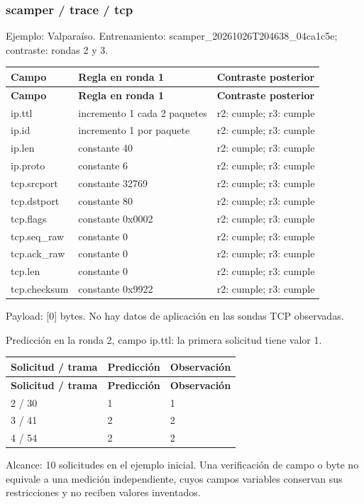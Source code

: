 \subsubsection{scamper / trace / tcp}
Ejemplo: Valparaíso. Entrenamiento: scamper\_\allowbreak{}20261026T204638\_\allowbreak{}04ca1c5e; contraste: rondas 2 y 3. 

\begingroup
\fontsize{9}{11}\selectfont
\addtocounter{table}{-1}
\begin{longtable}{p{3.1cm}p{5.8cm}p{5.1cm}}
\toprule
\textbf{Campo} & \textbf{Regla en ronda 1} & \textbf{Contraste posterior} \\ \midrule
\endfirsthead
\toprule
\textbf{Campo} & \textbf{Regla en ronda 1} & \textbf{Contraste posterior} \\ \midrule
\endhead
ip.ttl & incremento 1 cada 2 paquetes & r2: cumple; r3: cumple \\
ip.id & incremento 1 por paquete & r2: cumple; r3: cumple \\
ip.len & constante 40 & r2: cumple; r3: cumple \\
ip.proto & constante 6 & r2: cumple; r3: cumple \\
tcp.srcport & constante 32769 & r2: cumple; r3: cumple \\
tcp.dstport & constante 80 & r2: cumple; r3: cumple \\
tcp.flags & constante 0x0002 & r2: cumple; r3: cumple \\
tcp.seq\_\allowbreak{}raw & constante 0 & r2: cumple; r3: cumple \\
tcp.ack\_\allowbreak{}raw & constante 0 & r2: cumple; r3: cumple \\
tcp.len & constante 0 & r2: cumple; r3: cumple \\
tcp.checksum & constante 0x9922 & r2: cumple; r3: cumple \\
\bottomrule
\end{longtable}
\endgroup
Payload: [0] bytes. No hay datos de aplicación en las sondas TCP observadas.

Predicción en la ronda 2, campo ip.ttl: la primera solicitud tiene valor 1.

\begingroup
\fontsize{9}{11}\selectfont
\addtocounter{table}{-1}
\begin{longtable}{p{3.2cm}p{5.1cm}p{5.1cm}}
\toprule
\textbf{Solicitud / trama} & \textbf{Predicción} & \textbf{Observación} \\ \midrule
\endfirsthead
\toprule
\textbf{Solicitud / trama} & \textbf{Predicción} & \textbf{Observación} \\ \midrule
\endhead
2 / 30 & 1 & 1 \\
3 / 41 & 2 & 2 \\
4 / 54 & 2 & 2 \\
\bottomrule
\end{longtable}
\endgroup
Alcance: 10 solicitudes en el ejemplo inicial. Una verificación de campo o byte no equivale a una medición independiente, cuyos campos variables conservan sus restricciones y no reciben valores inventados.

